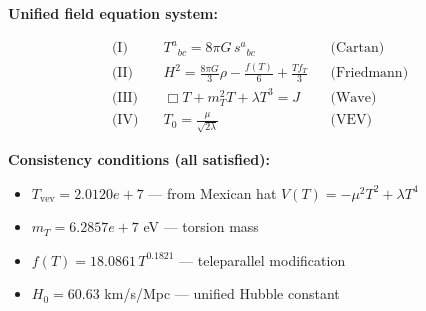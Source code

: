 
\textbf{Unified field equation system:}

\begin{align}
  \text{(I)} \quad & T^a{}_{bc} = 8\pi G \, s^a{}_{bc} && \text{(Cartan)} \\
  \text{(II)} \quad & H^2 = \frac{8\pi G}{3}\rho - \frac{f(T)}{6} + \frac{Tf_T}{3} && \text{(Friedmann)} \\
  \text{(III)} \quad & \Box T + m_T^2 T + \lambda T^3 = J && \text{(Wave)} \\
  \text{(IV)} \quad & T_0 = \frac{\mu}{\sqrt{2\lambda}} && \text{(VEV)}
\end{align}

\textbf{Consistency conditions (all satisfied):}
\begin{itemize}
  \item $T_{\text{vev}} = 2.0120e+7$ — from Mexican hat $V(T) = -\mu^2 T^2 + \lambda T^4$
  \item $m_T = 6.2857e+7$ eV — torsion mass
  \item $f(T) = 18.0861 \, T^{0.1821}$ — teleparallel modification
  \item $H_0 = 60.63$ km/s/Mpc — unified Hubble constant
\end{itemize}